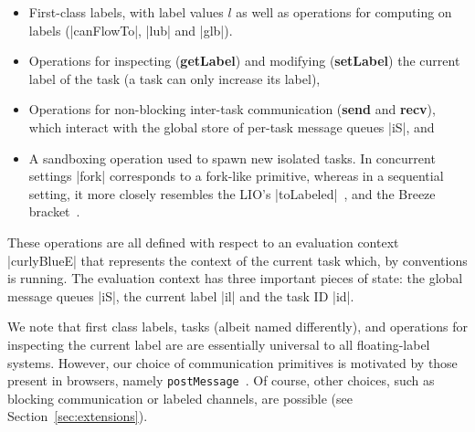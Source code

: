 \begin{itemize}
    \item First-class labels, with label values $l$ as well as operations for computing on
labels (|canFlowTo|, |lub| and |glb|).
    \item Operations for inspecting (\textbf{getLabel}) and modifying
    (\textbf{setLabel}) the current label of the task (a task can only increase its label),
    \item Operations for non-blocking inter-task communication (\textbf{send}
    and \textbf{recv}), which interact with the global store of per-task
    message queues |iS|, and
    \item A sandboxing operation used to spawn new isolated tasks. In
    concurrent settings |fork| corresponds to a fork-like primitive,
    whereas in a
    sequential setting, it more closely resembles the LIO's
    |toLabeled|~\cite{lio}, and the Breeze
    bracket~\cite{Hritcu:2013:YIB:2497621.2498098}.
\end{itemize}

These operations are all defined with respect to an evaluation context
|curlyBlueE| that represents the context of the current task which, by
conventions is running. The evaluation context has three important pieces of
state: the global message queues |iS|, the current label |il| and the task ID |id|.
 
We note that first class labels, tasks (albeit named differently), and
operations for inspecting the current label are are essentially universal to
all floating-label systems.
%
However, our choice of communication primitives is motivated by
those present in browsers, namely \texttt{postMessage}~\cite{webmessaging}.
%
Of course, other choices, such as blocking communication or labeled channels,
are possible (see Section~\ref{sec:extensions}).
%

